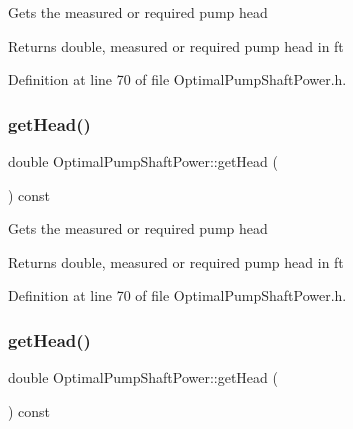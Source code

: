 Gets the measured or required pump head \begin{DoxyReturn}{Returns}
double, measured or required pump head in ft 
\end{DoxyReturn}


Definition at line 70 of file Optimal\+Pump\+Shaft\+Power.\+h.

\mbox{\label{class_optimal_pump_shaft_power_abb285a8a256c10187113c34db1a4462b}} 
\subsubsection{\texorpdfstring{get\+Head()}{getHead()}\hspace{0.1cm}{\footnotesize\ttfamily [2/3]}}
{\footnotesize\ttfamily double Optimal\+Pump\+Shaft\+Power\+::get\+Head (\begin{DoxyParamCaption}{ }\end{DoxyParamCaption}) const\hspace{0.3cm}{\ttfamily [inline]}}

Gets the measured or required pump head \begin{DoxyReturn}{Returns}
double, measured or required pump head in ft 
\end{DoxyReturn}


Definition at line 70 of file Optimal\+Pump\+Shaft\+Power.\+h.

\mbox{\label{class_optimal_pump_shaft_power_abb285a8a256c10187113c34db1a4462b}} 
\subsubsection{\texorpdfstring{get\+Head()}{getHead()}\hspace{0.1cm}{\footnotesize\ttfamily [3/3]}}
{\footnotesize\ttfamily double Optimal\+Pump\+Shaft\+Power\+::get\+Head (\begin{DoxyParamCaption}{ }\end{DoxyParamCaption}) const\hspace{0.3cm}{\ttfamily [inline]}}


